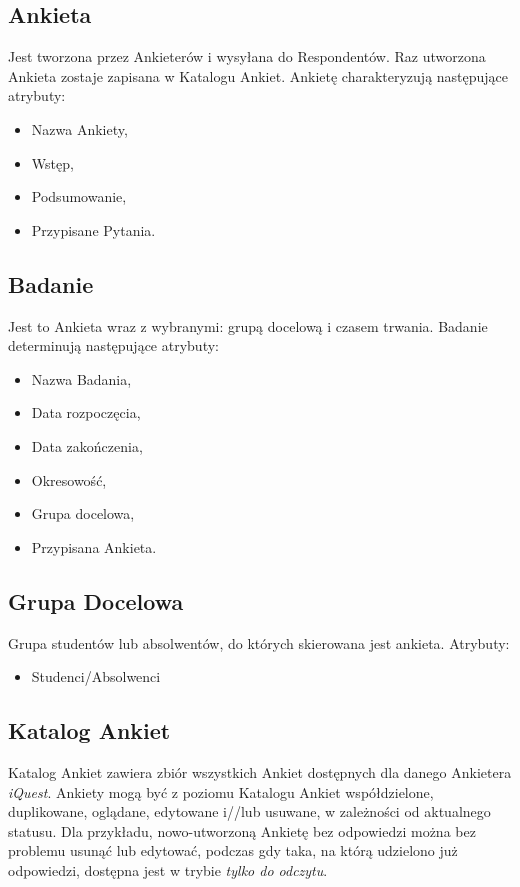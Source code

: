 \subsection{Ankieta}
\label{Chapter221}

Jest tworzona przez Ankieterów i wysyłana do Respondentów. Raz utworzona Ankieta zostaje zapisana w Katalogu Ankiet. Ankietę charakteryzują następujące atrybuty:

\begin{itemize}
\item Nazwa Ankiety,
\item Wstęp,
\item Podsumowanie,
\item Przypisane Pytania.
\end{itemize}

\subsection{Badanie}
\label{Chapter222}

Jest to Ankieta wraz z wybranymi: grupą docelową i czasem trwania. Badanie determinują następujące atrybuty:

\begin{itemize}
\item Nazwa Badania,
\item Data rozpoczęcia,
\item Data zakończenia,
\item Okresowość,
\item Grupa docelowa,
\item Przypisana Ankieta.
\end{itemize}

\subsection{Grupa Docelowa}
\label{Chapter223}

Grupa studentów lub absolwentów, do których skierowana jest ankieta. Atrybuty:

\begin{itemize}
\item Studenci\slash Absolwenci
\end{itemize}

\subsection{Katalog Ankiet}
\label{Chapter224}

Katalog Ankiet zawiera zbiór wszystkich Ankiet dostępnych dla danego Ankietera \textit{iQuest}. Ankiety mogą być z poziomu Katalogu Ankiet współdzielone, duplikowane, oglądane, edytowane i//lub usuwane, w zależności od aktualnego statusu. Dla przykładu, nowo-utworzoną Ankietę bez odpowiedzi można bez problemu usunąć lub edytować, podczas gdy taka, na którą udzielono już odpowiedzi, dostępna jest w trybie \textit{tylko do odczytu}.

